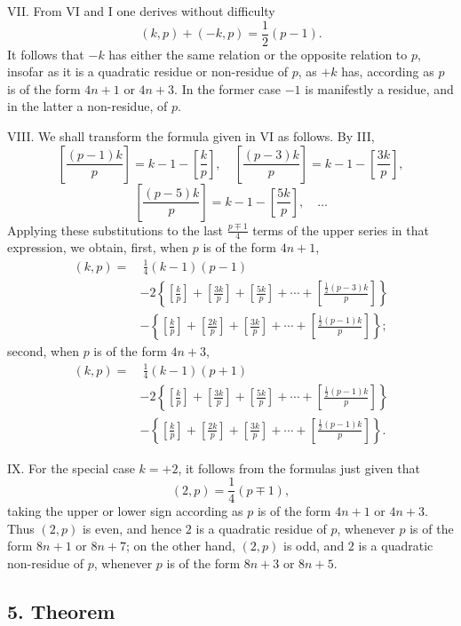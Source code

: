\documentclass[12pt]{article}
\begin{document}
VII. From VI and I one derives without difficulty
\[
(k,p)+(-k,p)=\frac12(p-1).
\]
It follows that $-k$ has either the same relation or the opposite relation to $p$, insofar as it is a quadratic residue or non-residue of $p$, as $+k$ has, according as $p$ is of the form $4n+1$ or $4n+3$. In the former case $-1$ is manifestly a residue, and in the latter a non-residue, of $p$.

VIII. We shall transform the formula given in VI as follows. By III,
\[
\left[\frac{(p-1)k}{p}\right]=k-1-\left[\frac{k}{p}\right],\quad
\left[\frac{(p-3)k}{p}\right]=k-1-\left[\frac{3k}{p}\right],
\]
\[
\left[\frac{(p-5)k}{p}\right]=k-1-\left[\frac{5k}{p}\right],\quad\ldots
\]
Applying these substitutions to the last $\frac{p\mp1}{4}$ terms of the upper series in that expression, we obtain, first, when $p$ is of the form $4n+1$,
\[
\begin{aligned}
(k,p)=&\ \frac14(k-1)(p-1)\\
&-2\left\{\left[\frac{k}{p}\right]+\left[\frac{3k}{p}\right]+\left[\frac{5k}{p}\right]+\cdots+\left[\frac{\frac12(p-3)k}{p}\right]\right\}\\
&-\left\{\left[\frac{k}{p}\right]+\left[\frac{2k}{p}\right]+\left[\frac{3k}{p}\right]+\cdots+\left[\frac{\frac12(p-1)k}{p}\right]\right\};
\end{aligned}
\]
second, when $p$ is of the form $4n+3$,
\[
\begin{aligned}
(k,p)=&\ \frac14(k-1)(p+1)\\
&-2\left\{\left[\frac{k}{p}\right]+\left[\frac{3k}{p}\right]+\left[\frac{5k}{p}\right]+\cdots+\left[\frac{\frac12(p-1)k}{p}\right]\right\}\\
&-\left\{\left[\frac{k}{p}\right]+\left[\frac{2k}{p}\right]+\left[\frac{3k}{p}\right]+\cdots+\left[\frac{\frac12(p-1)k}{p}\right]\right\}.
\end{aligned}
\]

IX. For the special case $k=+2$, it follows from the formulas just given that
\[
(2,p)=\frac14(p\mp1),
\]
taking the upper or lower sign according as $p$ is of the form $4n+1$ or $4n+3$. Thus $(2,p)$ is even, and hence $2$ is a quadratic residue of $p$, whenever $p$ is of the form $8n+1$ or $8n+7$; on the other hand, $(2,p)$ is odd, and $2$ is a quadratic non-residue of $p$, whenever $p$ is of the form $8n+3$ or $8n+5$.

\subsection*{5. Theorem}
\end{document}
